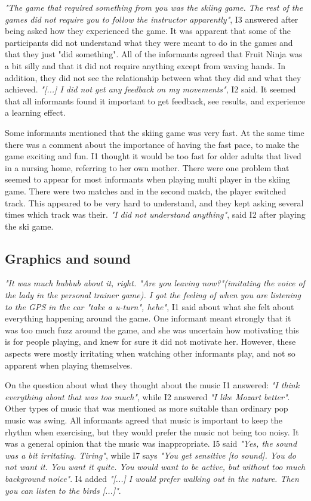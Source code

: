 \emph{"The game that required something from you was the skiing game. The rest of the games did not require you to follow the instructor apparently"}, I3 answered after being asked how they experienced the game. It was apparent that some of the participants did not understand what they were meant to do in the games and that they just "did something". All of the informants agreed that Fruit Ninja was a bit silly and that it did not require anything except from waving hands. In addition, they did not see the relationship between what they did and what they achieved. \emph{"[...] I did not get any feedback on my movements"}, I2 said. It seemed that all informants found it important to get feedback, see results, and experience a learning effect. 

Some informants mentioned that the skiing game was very fast. At the same time there was a comment about the importance of having the fast pace, to make the game exciting and fun. I1 thought it would be too fast for older adults that lived in a nursing home, referring to her own mother. There were one problem that seemed to appear for most informants when playing multi player in the skiing game. There were two matches and in the second match, the player switched track. This appeared to be very hard to understand, and they kept asking several times which track was their. \emph{"I did not understand anything"}, said I2 after playing the ski game. 

\subsection{Graphics and sound}
\emph{"It was much hubbub about it, right. "Are you leaving now?"(imitating the voice of the lady in the personal trainer game). I got the feeling of when you are listening to the GPS in the car "take a u-turn", hehe"}, I1 said about what she felt about everything happening around the game. One informant meant strongly that it was too much fuzz around the game, and she was uncertain how motivating this is for people playing, and knew for sure it did not motivate her. However, these aspects were mostly irritating when watching other informants play, and not so apparent when playing themselves. 

On the question about what they thought about the music I1 answered: \emph{"I think everything about that was too much"}, while I2 answered \emph{"I like Mozart better"}. Other types of music that was mentioned as more suitable than ordinary pop music was swing. All informants agreed that music is important to keep the rhythm when exercising, but they would prefer the music not being too noisy. It was a general opinion that the music was inappropriate.  I5 said \emph{"Yes, the sound was a bit irritating. Tiring"}, while I7 says \emph{"You get sensitive [to sound]. You do not want it. You want it quite. You would want to be active, but without too much background noice"}. I4 added \emph{"[...] I would prefer walking out in the nature. Then you can listen to the birds [...]"}.

